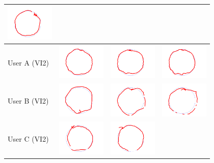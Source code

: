 \begin{tabular}{lccc}
\includegraphics[width=2.3cm]{../experiments/circle_Angus_2.png} \\
\midrule
 User A (VI2)&
\includegraphics[width=2.3cm]{../experiments/circle_Ayaka_p_0.png} &
\includegraphics[width=2.3cm]{../experiments/circle_Ayaka_p_1.png} &
\includegraphics[width=2.3cm]{../experiments/circle_Ayaka_p_2.png} \\
\midrule
 User B (VI2)&
\includegraphics[width=2.3cm]{../experiments/circle_Takeyo_p_0.png} &
\includegraphics[width=2.3cm]{../experiments/circle_Takeyo_p_1.png} &
\includegraphics[width=2.3cm]{../experiments/circle_Takeyo_p_2.png} \\
\midrule
 User C (VI2)&
\includegraphics[width=2.3cm]{../experiments/circle_Angus_p_0.png} &
\includegraphics[width=2.3cm]{../experiments/circle_Angus_p_1.png} &

\end{tabular}
